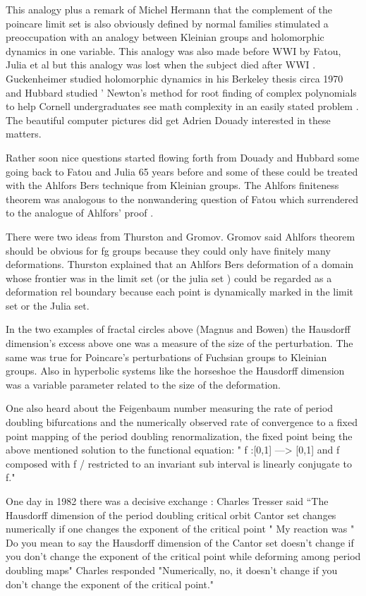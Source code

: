 \begin{description}
This analogy  plus a  remark of Michel Hermann that the complement of the poincare limit set is also obviously defined by normal families  stimulated a preoccupation with  an  analogy between Kleinian groups and holomorphic dynamics in one variable.  This  analogy  was  also made  before WWI by Fatou, Julia  et al  but  this analogy was lost when the subject died after WWI .  Guckenheimer   studied holomorphic dynamics in his Berkeley thesis  circa 1970 and Hubbard studied ' Newton's method for root finding of complex polynomials to help Cornell undergraduates  see math complexity in an easily stated problem . The beautiful computer pictures did get  Adrien Douady interested in these matters.

Rather soon nice questions started flowing forth from Douady and Hubbard  some going back to Fatou and Julia 65 years before  and some of these could be treated with the Ahlfors Bers technique from Kleinian groups. The Ahlfors finiteness theorem was analogous to the nonwandering question of Fatou which surrendered to the analogue of Ahlfors' proof .

 There were two ideas  from Thurston and Gromov.
 Gromov said Ahlfors theorem should be obvious for fg groups because they could only have finitely many deformations.
 Thurston  explained that  an Ahlfors Bers  deformation of a domain whose frontier was in the limit set (or the  julia set ) could be regarded as a deformation rel boundary  because each point is dynamically marked in the limit set or the Julia set.



 In the  two examples of fractal circles  above (Magnus and Bowen) the Hausdorff dimension's excess above one was a measure of the size of the perturbation.  The same was true for  Poincare's perturbations of Fuchsian groups to Kleinian groups.
Also in hyperbolic systems like the horseshoe the Hausdorff dimension was a variable parameter related to the size of the deformation.

  One also  heard about  the  Feigenbaum number  measuring the rate of period doubling bifurcations and the numerically observed rate of convergence to a fixed point mapping of the period doubling renormalization, the fixed point being the above mentioned solution to the functional equation:
" f :[0,1] ---> [0,1]  and f composed with f / restricted to an invariant  sub interval  is linearly conjugate to f."

One day in 1982  there was a decisive exchange :  Charles Tresser said
``The Hausdorff dimension of the period doubling critical orbit Cantor
set changes numerically if one changes the exponent of the critical point
"  My  reaction was " Do you mean to say  the Hausdorff dimension of the
Cantor set doesn't change if you don't change the  exponent of the
critical point while deforming among period doubling maps"  Charles
responded "Numerically, no, it doesn't change if you don't change the
exponent of the critical point."


\end{description}
